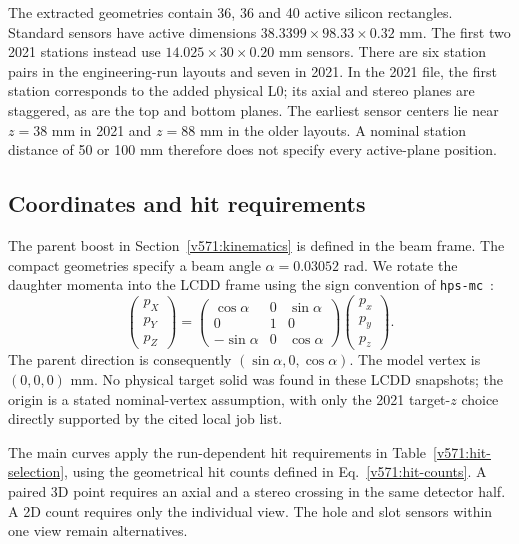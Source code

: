The extracted geometries contain 36, 36 and 40 active silicon rectangles.
Standard sensors have active dimensions
$38.3399\times98.33\times0.32$ mm. The first two 2021 stations instead use
$14.025\times30\times0.20$ mm sensors. There are six station pairs in the
engineering-run layouts and seven in 2021. In the 2021 file, the first station
corresponds to the added physical L0; its axial and stereo planes are staggered,
as are the top and bottom planes. The earliest sensor centers lie near
$z=38$ mm in 2021 and $z=88$ mm in the older layouts. A nominal station
distance of 50 or 100 mm therefore does not specify every active-plane position.

\subsection{Coordinates and hit requirements}
The parent boost in Section~\ref{v571:kinematics} is defined in the beam frame.
The compact geometries specify a beam angle $\alpha=0.03052$ rad. We rotate
the daughter momenta into the LCDD frame using the sign convention of
\texttt{hps-mc}~\cite{v571:beam-coords}:
\begin{equation}
 \begin{pmatrix}p_X\\p_Y\\p_Z\end{pmatrix}
 =\begin{pmatrix}\cos\alpha&0&\sin\alpha\\0&1&0\\-\sin\alpha&0&\cos\alpha\end{pmatrix}
 \begin{pmatrix}p_x\\p_y\\p_z\end{pmatrix}.
 \label{v571:beam-rotation}
\end{equation}
The parent direction is consequently $(\sin\alpha,0,\cos\alpha)$.
The model vertex is $(0,0,0)$ mm. No physical target solid was found in these
LCDD snapshots; the origin is a stated nominal-vertex assumption, with only
the 2021 target-$z$ choice directly supported by the cited local job list.

The main curves apply the run-dependent hit requirements in
Table~\ref{v571:hit-selection}, using the geometrical hit counts defined in
Eq.~\eqref{v571:hit-counts}. A paired 3D point requires an axial and a stereo
crossing in the same detector half. A 2D count requires only the individual
view. The hole and slot sensors within one view remain alternatives.


